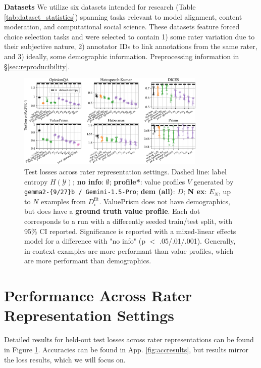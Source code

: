 \documentclass[11pt]{article}
\begin{document}
\textbf{Datasets }
We utilize six datasets 
intended for research
(Table \ref{tab:dataset_statistics}) spanning tasks relevant to model alignment, content moderation, and computational social science. These datasets feature forced choice selection tasks and were selected to contain 1) some rater variation due to their subjective nature, 2) annotator IDs to link annotations from the same rater, and 3) ideally, some demographic information.
Preprocessing information in \S \ref{sec:reproducibility}.

\begin{figure}[t]
\centering
\includegraphics[width=0.8\textwidth]{files/nll-short.pdf}
\small{
\caption{
Test losses across rater representation settings. Dashed line: label entropy $H(\mathcal{Y})$; {\bf no info}: $\emptyset$; \textcolor{profcolor}{\bf profile*}: value profiles $V$ generated by \texttt{gemma2-\{9/27\}b / Gemini-1.5-Pro}; \textcolor{demcolor}{\bf dem (all)}: $D$; \textcolor{excolor}{\bf N ex}: $E_N$, up to $N$ examples from $D_i^\textrm{fit}$. ValuePrism does not have demographics, but does have a \textcolor{gtcolor}{\bf ground truth value profile}. Each dot corresponds to a run with a differently seeded train/test split, with 95\% CI reported. Significance is reported with a mixed-linear effects model for a difference with "no info" (p $<$ .05/.01/.001). Generally, in-context examples are more performant than value profiles, which are more performant than demographics.
}
\label{fig:nllresults}
}
\end{figure}


\section{Performance Across Rater Representation Settings}
\label{sec:results-ratererep}
Detailed results for held-out test losses across rater representations can be found in Figure \ref{fig:nllresults}. Accuracies can be found in App. \ref{fig:accresults}, but results mirror the loss results, which we will focus on.
\end{document}
